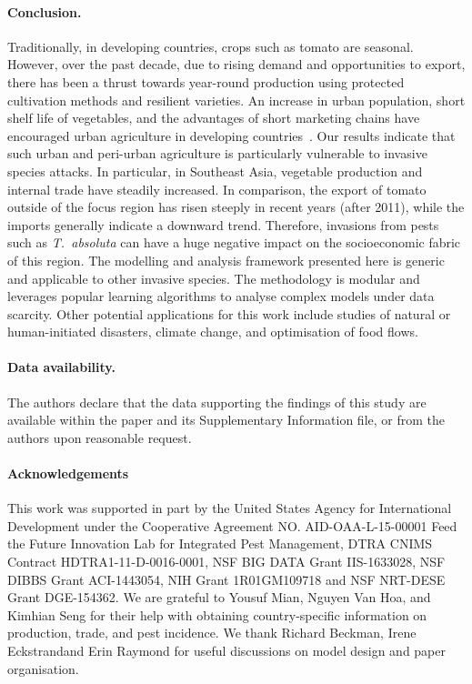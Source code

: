 \documentclass[11pt]{article}
\newcommand{\tuta}{\emph{T.~absoluta}}
\theoremstyle{definition}
\providecommand{\DIFaddtex}[1]{{\protect\color{blue}\uwave{#1}}} %
\providecommand{\DIFaddbegin}{} %
\providecommand{\DIFaddend}{} %
\providecommand{\DIFadd}[1]{\texorpdfstring{\DIFaddtex{#1}}{#1}} %
\newcommand{\DIFaddincludegraphics}[2][]{{\color{blue}\fbox{\DIFOincludegraphics[#1]{#2}}}} %
\DeclareRobustCommand{\DIFaddbegin}{\DIFOaddbegin \let\includegraphics\DIFaddincludegraphics} %
\DeclareRobustCommand{\DIFaddend}{\DIFOaddend \let\includegraphics\DIFOincludegraphics} %
\begin{document}
\paragraph{Conclusion.} Traditionally, in developing countries, crops such
as tomato are seasonal. However, over the past decade, due to rising demand and
opportunities to export, there has been a thrust towards year-round
production using protected cultivation methods and resilient varieties.
An increase in urban population, short shelf life of vegetables, and the
advantages of short marketing chains have encouraged urban agriculture in
developing countries~\cite{moustier2015urban}. Our results indicate that
such urban and peri-urban agriculture is particularly vulnerable to
invasive species attacks. In particular, in Southeast Asia, vegetable
production and internal trade have steadily increased. In comparison, the
export of tomato outside of the focus region has risen steeply in 
recent years (after 2011), while the imports generally indicate a downward
trend.  Therefore, invasions from pests such as \tuta{} can have a huge
negative impact on the socioeconomic fabric of this region. The modelling
and analysis framework presented here is generic and applicable to other
invasive species.  The methodology is modular and leverages popular
learning algorithms to analyse complex models under data scarcity.  Other
potential applications for this work include studies of natural or
human-initiated disasters, climate change, and optimisation of food flows.
\paragraph{Data availability.} The authors declare that the data supporting the
findings of this study are available within the paper and its Supplementary
Information file, or from the authors upon reasonable request.

\paragraph{Acknowledgements}
This work was supported in part by the United States Agency for
International Development under the Cooperative Agreement NO.
AID-OAA-L-15-00001 Feed the Future Innovation Lab for Integrated Pest
Management, DTRA CNIMS Contract HDTRA1-11-D-0016-0001, NSF BIG DATA Grant
IIS-1633028, NSF DIBBS Grant ACI-1443054, NIH Grant 1R01GM109718 and NSF
NRT-DESE Grant DGE-154362.  We are grateful to Yousuf Mian, Nguyen Van Hoa,
and Kimhian Seng for their help with obtaining country-specific information
on production, trade, and pest incidence. We thank Richard Beckman, Irene
Eckstrand\DIFaddbegin \DIFadd{, Srinivasan Venkatramanan, Stephen Eubank }\DIFaddend and Erin Raymond for
useful discussions on model design and paper organisation.
\end{document}
